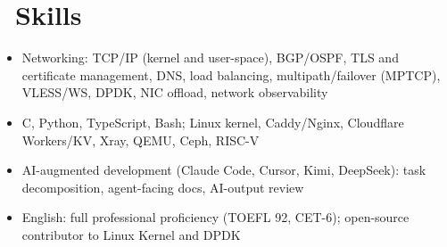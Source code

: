 \documentclass{resume}
\begin{document}
\section{\faWrench\ Skills}
\begin{itemize}[parsep=0.5ex]
  \item Networking: TCP/IP (kernel and user-space), BGP/OSPF, TLS and certificate management, DNS, load balancing, multipath/failover (MPTCP), VLESS/WS, DPDK, NIC offload, network observability
  \item C, Python, TypeScript, Bash; Linux kernel, Caddy/Nginx, Cloudflare Workers/KV, Xray, QEMU, Ceph, RISC-V
  \item AI-augmented development (Claude Code, Cursor, Kimi, DeepSeek): task decomposition, agent-facing docs, AI-output review
  \item English: full professional proficiency (TOEFL 92, CET-6); open-source contributor to Linux Kernel and DPDK
\end{itemize}
\end{document}
